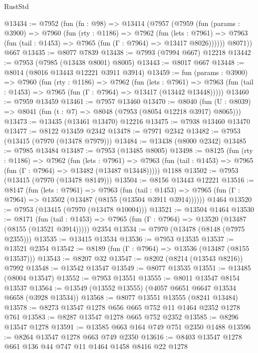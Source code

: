 \begin{lexlean}{RustStd}
\begin{coremodule}
@13434 := @7952
    (fun (fn : @98) =>
    @13414
      (@7957
        (@7959
          (fun (params : @3900) =>
          @7960
            (fun (rty : @1186) =>
            @7962
              (fun (lets : @7961) =>
              @7963 (fun (tail : @1453) => @7965 (fun (Γ : @7964) => @13417 @8026))))))
        @8071))
    @667
@13435 := @8077 @7839
@13438 := @7993 (@7994 @667) @12218
@13442 := @7953 (@7985 (@13438 @8001) @8005)
@13443 := @8017 @667
@13448 := @8014 (@8016 @13443 @12221 @3911 @3914)
@13459 := fun (params : @3900) =>
  @7960
    (fun (rty : @1186) =>
    @7962
      (fun (lets : @7961) =>
      @7963 (fun (tail : @1453) => @7965 (fun (Γ : @7964) => @13417 (@13442 @13448)))))
@13460 := @7959 @13459
@13461 := @7957 @13460
@13470 := @8040
    (fun (U : @8039) => @8041 (fun (t : @7) => @8048 (@7953 (@8054 @12218 @3917) @8065)))
@13473 := @13435 (@13461 @13470) @12216
@13475 := @7938 @13460 @13470
@13477 := @8122 @13459 @2342
@13478 := @7971 @2342
@13482 := @7953 (@13415 (@7970 (@13478 @7979)))
@13484 := @13438 (@8000 @2342)
@13485 := @7985 @13484
@13487 := @7953 (@13485 @8005)
@13498 := @8125
    (fun (rty : @1186) =>
    @7962
      (fun (lets : @7961) =>
      @7963 (fun (tail : @1453) => @7965 (fun (Γ : @7964) => @13482 (@13487 @13448)))))
    @1188
@13502 := @7953 (@13415 (@7970 (@13478 @8149)))
@13504 := @8156 @13443 @12221
@13516 := @8147
    (fun (lets : @7961) =>
    @7963
      (fun (tail : @1453) =>
      @7965 (fun (Γ : @7964) => @13502 (@13487 (@8155 (@13504 @3911 @3914))))))
    @1464
@13520 := @7953 (@13415 (@7970 (@13478 @10004)))
@13521 := @13504 @1464
@13530 := @8171
    (fun (tail : @1453) => @7965 (fun (Γ : @7964) => @13520 (@13487 (@8155 (@13521 @3914)))))
    @2354
@13534 := @7970 (@13478 (@8148 (@7975 @2355)))
@13535 := @13415 @13534
@13536 := @7953 @13535
@13537 := @13521 @2354
@13542 := @8189 (fun (Γ : @7964) => @13536 (@13487 (@8155 @13537)))
@13543 := @8207 @32
@13547 := @8202 (@8214 (@13543 @8216)) @7992
@13548 := @13542 @13547
@13549 := @8077 @13535
@13551 := @13485 (@8004 @13547)
@13552 := @7953 @13551
@13555 := @8011 @13547 @8154 @13537
@13564 := @13549 (@13552 @13555) (@4057 @6651 @6647 @13534 @6658 (@3928 @13534))
@13568 := @8077 @13551 @13555 (@8241 @13484)
@13578 := @8273 @13547 @1278 @656 @665 @752 @11 @1464 @2352 @1278 @761
@13583 := @8287 @13547 @1278 @665 @752 @2352
@13585 := @8296 @13547 @1278
@13591 := @13585 @663 @164 @749 @751 @2350 @1488
@13596 := @8264 @13547 @1278 @663 @749 @2350
@13616 := @8403
    @13547
    @1278
    @661
    @136
    @44
    @747
    @11
    @1464
    @1458
    @8416
    @22
    @1278

\end{coremodule}
\end{lexlean}
